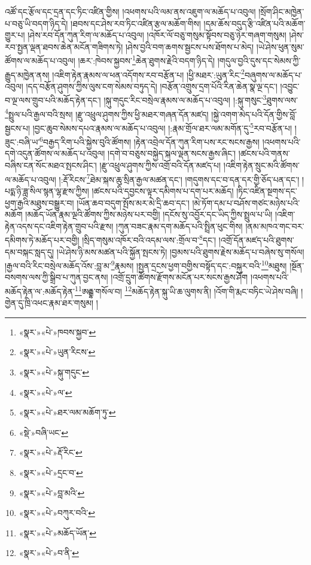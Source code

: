 འཚོ་དང་རྩོལ་དང་དྲན་དང་ཏིང་འཛིན་གྱིས། །འཕགས་པའི་ལམ་ནས་འཇུག་ལ་མཆོད་པ་འབུལ། །སྲོག་ཤིང་མཁྱེན་པ་བཅུ་ཡི་བདག་ཉིད་དེ། །ཐབས་དང་ཤེས་རབ་ཏིང་འཛིན་རྩལ་མཆོག་གིས། །དམ་ཆོས་བདུད་རྩི་འཛིན་པའི་མཆོག་གྱུར་པ། །ཤེས་རབ་དོན་ཀུན་རིག་ལ་མཆོད་པ་འབུལ། །འཁོར་ལོ་བཅུ་གསུམ་སྟོབས་བཅུ་ཉེར་གཞག་གསུམ། །ཤེས་རབ་སྤྱན་ལྡན་ཐབས་ཆེན་མངོན་གཟིགས་ཏེ། །ཤེས་བྱའི་བག་ཆགས་སྦྱངས་པས་ཐོགས་པ་མེད། །ཡེ་ཤེས་ཕུན་སུམ་ཚོགས་ལ་མཆོད་པ་འབུལ། །ཆར་:ཁེབས་སྐྱབས་\footnote{«སྣར་»«པེ་»ཁབས་སྐྱབ་}ཆེན་ཐུགས་རྗེའི་བདག་ཉིད་དེ། །གདུལ་བྱའི་དུས་དང་སེམས་ཀྱི་རྒྱུད་མཁྱེན་ནས། །འཇིག་རྟེན་རྣམས་ལ་ཕན་འདོགས་རབ་བརྩོན་པ། །ཕྱི་མཐར་:ཡུན་རིང་\footnote{«སྣར་»«པེ་»ཡུན་རིངས་}བཞུགས་ལ་མཆོད་པ་འབུལ། །དད་བརྩོན་ཤུགས་ཀྱིས་ལུས་ངག་སེམས་བཏུད་དེ། །བརྩོན་འགྲུས་དྲག་པོའི་རིན་ཆེན་སྣ་ལྔ་དང་། །འབྱུང་བ་ལྔ་ལས་གྲུབ་པའི་མཆོད་རྟེན་དང་། །སྐུ་གདུང་རིང་བསྲེལ་རྣམས་ལ་མཆོད་པ་འབུལ། །:སྐུ་གསུང་\footnote{«སྣར་»«པེ་»སྐུ་གདུང་}ཐུགས་ལས་\footnote{«སྣར་»«པེ་»ལ་}སྤྲུལ་པའི་རྒྱལ་བའི་སྲས། །རྫུ་འཕྲུལ་ཤུགས་ཀྱིས་ཕྱི་མཐར་གཞན་དོན་མཛད། །སྐྱེ་འགག་མེད་པའི་དོན་གྱིས་བློ་སྦྱངས་པ། །བྱང་ཆུབ་སེམས་དཔའ་རྣམས་ལ་མཆོད་པ་འབུལ། །:རྣམ་གྲོལ་ཐར་ལམ་མགོན་དུ་\footnote{«སྣར་»«པེ་»ཐར་ལམ་མཆོག་ཏུ་}རབ་བརྩོན་པ། །ཟུང་:བཞི་ཡ་\footnote{«སྡེ་»བཞི་ཡང་}བརྒྱད་རིག་པའི་སྐྱེས་བུའི་ཚོགས། །རྟེན་འབྲེལ་དོན་ཀུན་རིག་པས་རང་སངས་རྒྱས། །འཕགས་པའི་དགེ་འདུན་ཚོགས་ལ་མཆོད་པ་འབུལ། །དགེ་བ་བཅུས་བསྐྱེད་སྐལ་ལྡན་སངས་རྒྱས་ཞིང་། །ཚངས་པའི་གནས་བཞིས་ངན་སོང་མཐའ་སྤངས་ཤིང་། །རྫུ་འཕྲུལ་ཤུགས་ཀྱིས་འགྲོ་བའི་དོན་མཛད་པ། །འཇིག་རྟེན་སྲུང་མའི་ཚོགས་ལ་མཆོད་པ་འབུལ། །:རྡོ་རིངས་\footnote{«སྣར་»«པེ་»རྡོ་རིང་}ཐེམ་སྐས་ཆུ་སྲིན་རྒྱལ་མཚན་དང་། །གདུགས་དང་བ་དན་དར་གྱི་ཅོད་པན་དང་། །པདྨ་ཉི་ཟླ་སིལ་སྙན་ལྷ་རྫས་ཀྱིས། །ཚངས་པའི་དབྱངས་ལྟར་དམིགས་པ་དག་པར་མཆོད། །ཏིང་འཛིན་སྔགས་དང་ཕྱག་རྒྱའི་མཐུས་བསྒྱུར་བ། །ཡོན་ཆབ་བདུག་སྤོས་མར་མེ་དྲི་ཆབ་དང་། །མེ་ཏོག་དམ་པ་བཤོས་གཙང་མཉེས་པའི་མཆོག །མཆོད་ཡོན་རྣམ་ལྔའི་ཚོགས་ཀྱིས་མཉེས་པར་བགྱི། །དངོས་སུ་འབྱོར་དང་ཡིད་ཀྱིས་སྤྲུལ་པ་ཡི། །འཇིག་རྟེན་འདས་དང་འཇིག་རྟེན་གྲུབ་པའི་རྫས། །ཀུན་བཟང་རྣམ་དག་མཆོད་པའི་སྤྲིན་ཕུང་གིས། །ནམ་མཁའ་གང་བར་དམིགས་ཏེ་མཆོད་པར་བགྱི། །སྲིད་གསུམ་འཁོར་བའི་འདམ་ལས་:གྲོལ་བ་\footnote{«སྣར་»«པེ་»དྲང་བ་}དང་། །འགྲོ་དོན་མཛད་པའི་ཐུགས་དམ་བསྐང་སླད་དུ། །ཡེ་ཤེས་ཉི་མས་མཚན་པའི་སྐྱོན་སྤངས་ཏེ། །བྱམས་པའི་ཐུགས་རྗེས་མཆོད་པ་བཞེས་སུ་གསོལ། །རྒྱལ་བའི་རིང་བསྲེལ་མཆོད་འོས་:བླ་མ་\footnote{«སྣར་»«པེ་»བླ་མའི་}རྣམས། །སྤྱན་དྲངས་ཕྱག་བགྱིས་བསྟོད་དང་:བསྐུར་བའི་\footnote{«སྣར་»«པེ་»བཀུར་བའི་}མཐུས། །སྔོན་བསགས་ལས་ཀྱི་སྒྲིབ་པ་ཀུན་བྱང་ནས། །འགྲོ་དྲུག་ཚོགས་རྫོགས་མངོན་པར་སངས་རྒྱས་ཤོག །འཕགས་པའི་མཆོད་རྟེན་ལ་:མཆོད་རྟེན་\footnote{«སྣར་»«པེ་»མཆོད་ཡོན་}ཨརྒྷ་གསོལ་བ། \footnote{«སྣར་»«པེ་»བ་ནི་}མཆོད་རྟེན་སྐུ་ཡི་ཆ་ལུགས་ནི། །འོག་གི་རྨང་བཏིང་ཡེ་ཤེས་བཞི། །གྱེན་དུ་ཁྲི་འཕང་རྣམ་ཐར་གསུམ། །
